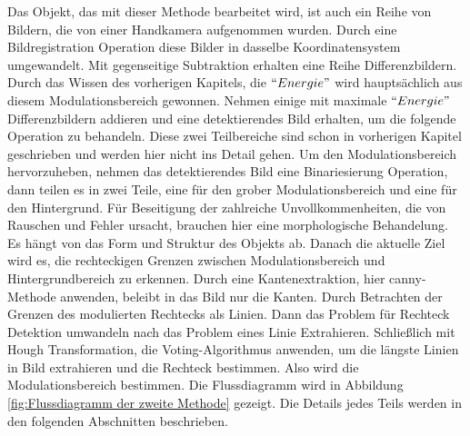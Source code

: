 Das Objekt, das mit dieser Methode bearbeitet wird, ist auch ein Reihe von Bildern, die von einer Handkamera aufgenommen wurden. Durch eine Bildregistration Operation diese Bilder in dasselbe Koordinatensystem umgewandelt. Mit gegenseitige Subtraktion erhalten eine Reihe Differenzbildern. Durch das Wissen des vorherigen Kapitels, die $``Energie"$ wird hauptsächlich aus diesem Modulationsbereich gewonnen. Nehmen einige mit maximale $``Energie"$ Differenzbildern addieren und eine detektierendes Bild erhalten, um die folgende Operation zu behandeln. Diese zwei Teilbereiche sind schon in vorherigen Kapitel geschrieben und werden hier nicht ins Detail gehen. Um den Modulationsbereich hervorzuheben, nehmen das detektierendes Bild eine Binariesierung Operation, dann teilen es in zwei Teile, eine für den grober Modulationsbereich und eine für den Hintergrund. Für Beseitigung der zahlreiche Unvollkommenheiten, die von Rauschen und Fehler ursacht, brauchen hier eine morphologische Behandelung. Es hängt von das Form und Struktur des Objekts ab. Danach die aktuelle Ziel wird es, die rechteckigen Grenzen zwischen Modulationsbereich und Hintergrundbereich zu erkennen. Durch eine Kantenextraktion, hier canny-Methode anwenden, beleibt in das Bild nur die Kanten.  Durch Betrachten der Grenzen des modulierten Rechtecks als Linien. Dann das Problem für Rechteck Detektion umwandeln nach das Problem eines Linie Extrahieren. Schließlich mit Hough Transformation, die Voting-Algorithmus anwenden, um die längste Linien in Bild extrahieren und die Rechteck bestimmen. Also wird die Modulationsbereich bestimmen. Die Flussdiagramm wird in Abbildung \ref{fig:Flussdiagramm der zweite Methode} gezeigt. Die Details jedes Teils werden in den folgenden Abschnitten beschrieben.

